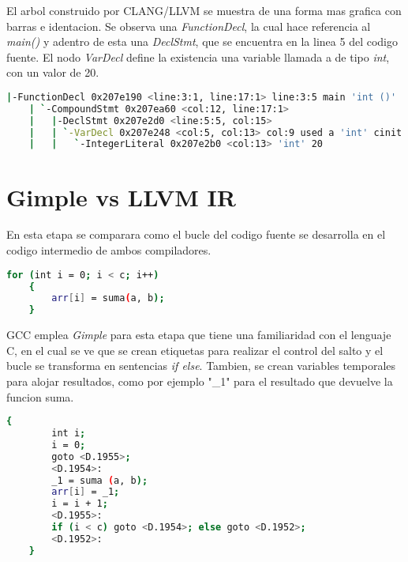 El arbol construido por CLANG/LLVM se muestra de una forma mas grafica con barras e identacion. 
Se observa una \emph{FunctionDecl}, la cual hace referencia al \emph{main()} y adentro de esta una 
\emph{DeclStmt}, que se encuentra en la linea 5 del codigo fuente. El nodo \emph{VarDecl} 
define la existencia una variable llamada a de tipo \emph{int}, con un valor de 20.

\begin{lstlisting}[label=comandoC, caption= Fragmento del arbol de CLANG/LLVM del archivo ast \cite{repositorio} para GCC., language=bash]
    |-FunctionDecl 0x207e190 <line:3:1, line:17:1> line:3:5 main 'int ()'
    | `-CompoundStmt 0x207ea60 <col:12, line:17:1>
    |   |-DeclStmt 0x207e2d0 <line:5:5, col:15>
    |   | `-VarDecl 0x207e248 <col:5, col:13> col:9 used a 'int' cinit
    |   |   `-IntegerLiteral 0x207e2b0 <col:13> 'int' 20   \end{lstlisting}


\section{Gimple vs LLVM IR}

En esta etapa se comparara como el bucle del codigo fuente se desarrolla en el codigo intermedio 
de ambos compiladores. 

\begin{lstlisting}[label=comandoC, caption= Fragmento del codigo fuente del archivo codigo-ejemplo.c \cite{repositorio} para GCC., language=bash]
    for (int i = 0; i < c; i++)
    {
        arr[i] = suma(a, b);
    }   \end{lstlisting}

GCC emplea \emph{Gimple} para esta etapa que tiene una familiaridad con el lenguaje C, 
en el cual se ve que se crean etiquetas para realizar el control del salto 
y el bucle se transforma en sentencias \emph{if else}. Tambien, se crean variables 
temporales para alojar resultados, como por ejemplo "\_1" para el resultado que 
devuelve la funcion suma.  

\begin{lstlisting}[label=comandoC, caption= Fragmento del \emph{Gimple} de GCC del archivo codigo-ejemplo.c.006t.gimple \cite{repositorio} para GCC., language=bash]
    {
        int i;
        i = 0;
        goto <D.1955>;
        <D.1954>:
        _1 = suma (a, b);
        arr[i] = _1;
        i = i + 1;
        <D.1955>:
        if (i < c) goto <D.1954>; else goto <D.1952>;
        <D.1952>:
    } \end{lstlisting}

